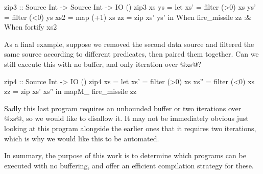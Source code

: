 \begin{code}
zip3 :: Source Int -> Source Int -> IO ()
zip3 xs ys
 = let xs'  = filter (>0) xs
       ys'  = filter (<0) ys
       xs2  = map    (+1) xs
       zz   = zip xs' ys'
   in  When fire_missile zz
   :&  When fortify      xs2
\end{code}

As a final example, suppose we removed the second data source and filtered the same source according to different predicates, then paired them together.
Can we still execute this with no buffer, and only iteration over @xs@?

\begin{code}
zip4 :: Source Int -> IO ()
zip4 xs
 = let xs'  = filter (>0) xs
       xs'' = filter (<0) xs
       zz   = zip xs' xs''
   in  mapM_ fire_missile zz
\end{code}

Sadly this last program requires an unbounded buffer or two iterations over @xs@, so we would like to disallow it.
It may not be immediately obvious just looking at this program alongside the earlier ones that it requires two iterations, which is why we would like this to be automated.

In summary, the purpose of this work is to determine which programs can be executed with no buffering, and offer an efficient compilation strategy for these.

